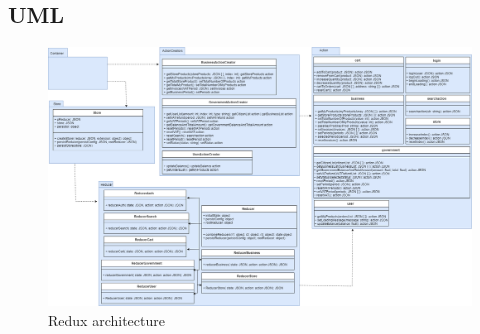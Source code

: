 \begin{landscape}
	\subsection{UML} 
	\begin{figure}[H]
		\centering\includegraphics[scale = 0.365]{res/images/ReduxDiagram.png}
		\caption{Redux architecture}
	\end{figure}
\end{landscape}